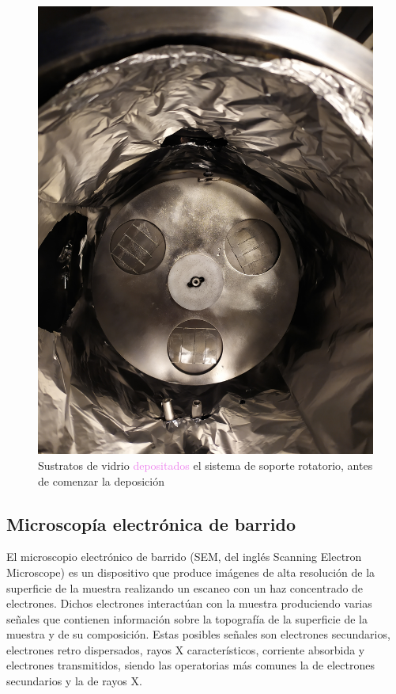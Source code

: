 \documentclass[12pt]{article}
\theoremstyle{definition}
\theoremstyle{remark}
\begin{document}
\begin{figure}[H]
	\centering
	\includegraphics[scale=0.1]{img/muestras.jpg}
	\caption{Sustratos de vidrio \textcolor{violet}{depositados} el sistema de soporte rotatorio, antes de comenzar la deposición}
	\label{muestras}
\end{figure}

\subsection{Microscopía electrónica de barrido}
El microscopio electrónico de barrido (SEM, del inglés Scanning Electron Microscope) es un dispositivo que produce imágenes de alta resolución de la superficie de la muestra realizando un escaneo con un haz concentrado de electrones. Dichos electrones interactúan con la muestra produciendo varias señales que contienen información sobre la topografía de la superficie de la muestra y de su composición. Estas posibles señales son electrones secundarios, electrones retro dispersados, rayos X característicos, corriente absorbida y electrones transmitidos, siendo las operatorias más comunes la de electrones secundarios y la de rayos X.
\end{document}
